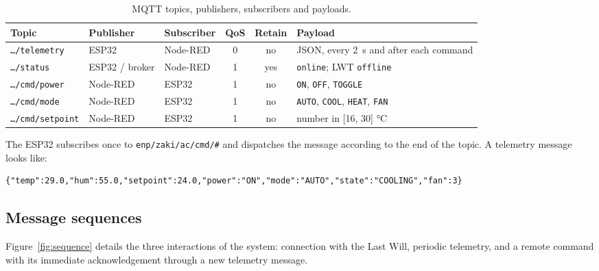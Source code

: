 \documentclass[11pt,a4paper]{article}
\newcommand{\topic}[1]{\texttt{\small #1}}
\begin{document}
\begin{table}[H]
\centering\small
\caption{MQTT topics, publishers, subscribers and payloads.}
\label{tab:topics}
\begin{tabularx}{\linewidth}{@{}l l l c c X@{}}
\toprule
\textbf{Topic} & \textbf{Publisher} & \textbf{Subscriber} & \textbf{QoS} & \textbf{Retain} & \textbf{Payload} \\
\midrule
\topic{…/telemetry} & ESP32 & Node-RED & 0 & no & JSON, every \SI{2}{s} and after each command \\
\topic{…/status} & ESP32 / broker & Node-RED & 1 & yes & \texttt{online}; LWT \texttt{offline} \\
\topic{…/cmd/power} & Node-RED & ESP32 & 1 & no & \texttt{ON}, \texttt{OFF}, \texttt{TOGGLE} \\
\topic{…/cmd/mode} & Node-RED & ESP32 & 1 & no & \texttt{AUTO}, \texttt{COOL}, \texttt{HEAT}, \texttt{FAN} \\
\topic{…/cmd/setpoint} & Node-RED & ESP32 & 1 & no & number in [16, 30] \si{\celsius} \\
\bottomrule
\end{tabularx}
\end{table}

\noindent The ESP32 subscribes once to \topic{enp/zaki/ac/cmd/\#} and dispatches the message
according to the end of the topic. A telemetry message looks like:

\begin{lstlisting}[style=json]
{"temp":29.0,"hum":55.0,"setpoint":24.0,"power":"ON","mode":"AUTO","state":"COOLING","fan":3}
\end{lstlisting}

\subsection{Message sequences}
Figure~\ref{fig:sequence} details the three interactions of the system: connection with the
Last Will, periodic telemetry, and a remote command with its immediate acknowledgement through
a new telemetry message.
\end{document}
